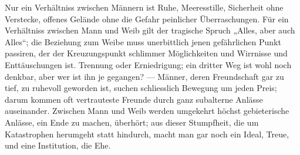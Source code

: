 Nur ein Verhältniss zwischen Männern ist Ruhe, Meeresstille, Sicherheit ohne Verstecke, offenes Gelände ohne die Gefahr peinlicher Überraschungen. Für ein Verhältniss zwischen Mann und Weib gilt der tragische Spruch „Alles, aber auch Alles“; die Beziehung zum Weibe muss unerbittlich jenen gefährlichen Punkt passiren, der der Kreuzungspunkt schlimmer Möglichkeiten und Wirrnisse und Enttäuschungen ist. Trennung oder Erniedrigung; ein dritter Weg ist wohl noch denkbar, aber wer ist ihn je gegangen? — Männer, deren Freundschaft gar zu tief, zu ruhevoll geworden ist, suchen schliesslich Bewegung um jeden Preis; darum kommen oft vertrauteste Freunde durch ganz subalterne Anlässe auseinander. Zwischen Mann und Weib werden umgekehrt höchst gebieterische Anlässe, ein Ende zu machen, überhört; aus dieser Stumpfheit, die um Katastrophen herumgeht statt hindurch, macht man gar noch ein Ideal, Treue, und eine Institution, die Ehe.
\par

